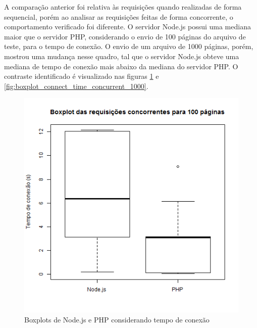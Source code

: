 \documentclass[conference,compsoc]{IEEEtran}
\begin{document}
A comparação anterior foi relativa às requisições quando realizadas de forma sequencial, porém ao analisar as requisições feitas de forma concorrente, o comportamento verificado foi diferente. O servidor Node.js possui uma mediana maior que o servidor PHP, considerando o envio de 100 páginas do arquivo de teste, para o tempo de conexão. O envio de um arquivo de 1000 páginas, porém, mostrou uma mudança nesse quadro, tal que o servidor Node.js obteve uma mediana de tempo de conexão mais abaixo da mediana do servidor PHP. O contraste identificado é visualizado nas figuras \ref{fig:boxplot_connect_time_concurrent_100} e \ref{fig:boxplot_connect_time_concurrent_1000}.
\\
\begin{figure}[h!]
\centering
  \includegraphics[scale=0.35]{plots/boxplots/concurrent/CONNECT_TIME/boxplot_CONNECT_TIME_100_pages.png}
  \caption{Boxplots de Node.js e PHP considerando tempo de conexão}
  \label{fig:boxplot_connect_time_concurrent_100}
\end{figure}
\end{document}
